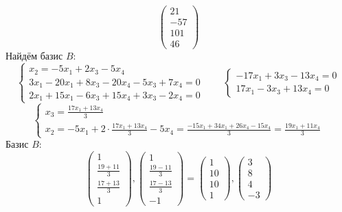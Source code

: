 $$
\begin{pmatrix}
	21 \\
    -57 \\
    101 \\
    46
\end{pmatrix} $$
Найдём базис $ B $:
$$
\begin{cases}
	x_2 = -5x_1 + 2x_3 - 5x_4 \\
    3x_1 - 20x_1 + 8x_3 - 20x_4 - 5x_3 + 7x_4 = 0 \\
    2x_1 + 15x_1 - 6x_3 + 15x_4 + 3x_3 - 2x_4 = 0
\end{cases} \qquad
\begin{cases}
	-17x_1 + 3x_3 - 13x_4 = 0 \\
    17x_1 - 3x_3 + 13x_4 = 0
\end{cases} $$
$$
\begin{cases}
    x_3 = \frac{17x_1 + 13x_4}3 \\
    x_2 = -5x_1 + 2 \cdot \frac{17x_1 + 13x_4}3 - 5x_4 = \frac{-15x_1 + 34x_1 + 26x_4 - 15x_4}3 = \frac{19x_1 + 11x_4}3
\end{cases} $$
Базис $ B $:
$$
\begin{pmatrix}
    1 \\
    \frac{19 + 11}3 \\
    \frac{17 + 13}3 \\
    1
\end{pmatrix},
\begin{pmatrix}
	1 \\
    \frac{19 - 11}3 \\
    \frac{17 - 13}3 \\
    -1
\end{pmatrix} =
\begin{pmatrix}
	1 \\
    10 \\
    10 \\
    1
\end{pmatrix},
\begin{pmatrix}
	3 \\
    8 \\
    4 \\
    -3
\end{pmatrix} $$

\section{}

